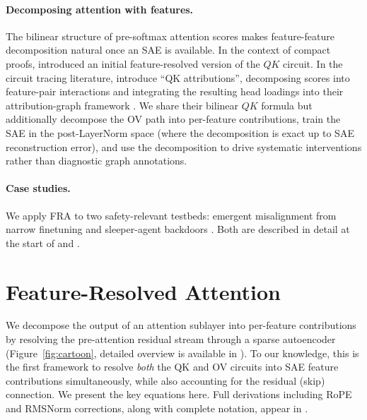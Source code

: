 \documentclass{article}
\theoremstyle{plain}
\theoremstyle{definition}
\theoremstyle{remark}
\begin{document}
\paragraph{Decomposing attention with features.} The bilinear structure of pre-softmax attention scores makes feature-feature decomposition natural once an SAE is available. In the context of compact proofs, \citep{featints_compact_2025} introduced an initial feature-resolved version of the $QK$ circuit. In the circuit tracing literature, \citet{kamath2025tracing} introduce ``QK attributions'', decomposing scores into feature-pair interactions and integrating the resulting head loadings into their attribution-graph framework \citep{lindsey2025biology}. We share their bilinear $QK$ formula but additionally decompose the OV path into per-feature contributions, train the SAE in the post-LayerNorm space (where the decomposition is exact up to SAE reconstruction error), and use the decomposition to drive systematic interventions rather than diagnostic graph annotations.
\paragraph{Case studies.} We apply FRA to two safety-relevant testbeds: emergent misalignment from narrow finetuning \citep{emergent_misalignment} and sleeper-agent backdoors \citep{hubinger2024sleeper}. Both are described in detail at the start of  and .

\section{Feature-Resolved Attention}
\label{sec:fra}

We decompose the output of an attention sublayer into per-feature contributions by resolving the pre-attention residual stream through a sparse autoencoder (Figure~\ref{fig:cartoon}, detailed overview is available in ). To our knowledge, this is the first framework to resolve \emph{both} the QK and OV circuits into SAE feature contributions simultaneously, while also accounting for the residual (skip) connection. We present the key equations here. Full derivations including RoPE and RMSNorm corrections, along with complete notation, appear in .
\end{document}
